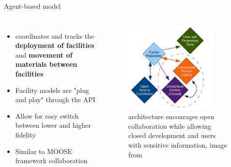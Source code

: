 \begin{frame}{Agent-based model}
\begin{columns}
\begin{itemize}
    \item \Cyclus coordinates and tracks the \textbf{deployment of facilities} and \textbf{movement of materials between facilities}
    \item Facility models are "plug and play" through the API
    \item Allow for easy switch between lower and higher fidelity
    \item Similar to MOOSE framework collaboration
\end{itemize}
\begin{figure}
    \centering
    \includegraphics[width=0.85\textwidth]{images/Cyclus_ecosystem.png}
    \caption{\Cyclus architecture encourages open collaboration while allowing closed development and users with sensitive information, image from \cite{huff_fundamental_2016}}
    \label{fig:cyclus_ecosystem}
\end{figure}
\end{columns}
\end{frame}



